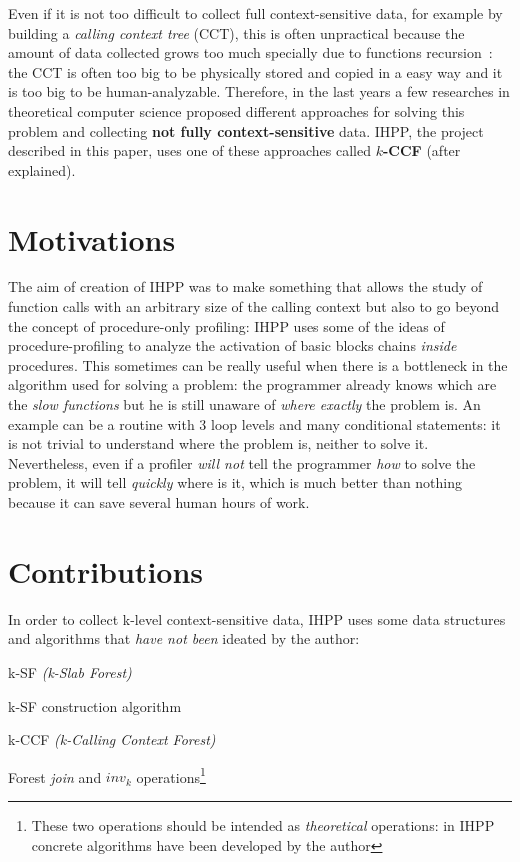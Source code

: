 \documentclass[a4paper,10pt]{report}
\begin{document}
\noindent
Even if it is not too difficult to collect full context-sensitive data, 
for example by building a \emph{calling context
tree} (CCT), this is often unpractical because the amount of data collected
 grows too much specially due to functions recursion~\cite{kccf}: 
the CCT is often too big to be physically stored and copied
in a easy way and it is too big to be human-analyzable.
Therefore, in the last years a few researches in theoretical computer science 
proposed different approaches for solving this problem and collecting \textbf{not fully context-sensitive} data. IHPP, the project described in this paper, uses one of these approaches called \textbf{$k$-CCF} (after explained).

\section{Motivations}

The aim of creation of IHPP was to make something that allows the study of
function calls with an arbitrary size of the calling context but also to go
beyond the concept of procedure-only profiling: IHPP uses some of the ideas of
procedure-profiling to analyze the activation of basic blocks chains \emph{inside}
 procedures. This sometimes can be really useful when there is a bottleneck in
the algorithm used for solving a problem: the programmer already knows which are
the \emph{slow functions} but he is still unaware of \emph{where exactly}
the problem is. An example can be a routine with 3 loop levels and many conditional
statements: it is not trivial to understand where the problem is, neither to
solve it. Nevertheless, even if a profiler \emph{will not} tell the programmer \emph{how}
to solve the problem, it will tell \emph{quickly} where is it, which is much
better than nothing because it can save several human hours of work.

\section{Contributions}

In order to collect k-level context-sensitive data, IHPP uses some data
structures and algorithms that \emph{have not been} ideated by the author:

\begin{itemize*}
\item k-SF \emph{(k-Slab Forest)}
\item k-SF construction algorithm
\item k-CCF \emph{(k-Calling Context Forest)}
\item Forest \emph{join} and $inv_k$ operations\footnote{These two operations should
be intended as \emph{theoretical} operations: in IHPP concrete algorithms have been
developed by the author}
\end{itemize*}
\end{document}
